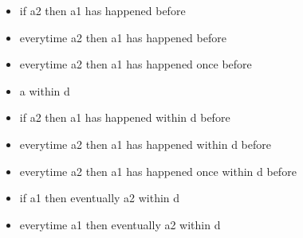 \begin{itemize}
	\item
\begin{IMITATORproperty}
if a2 then a1 has happened before
\end{IMITATORproperty}

	\item
\begin{IMITATORproperty}
everytime a2 then a1 has happened before
\end{IMITATORproperty}

	\item
\begin{IMITATORproperty}
everytime a2 then a1 has happened once before
\end{IMITATORproperty}

	\item
\begin{IMITATORproperty}
a within d
\end{IMITATORproperty}

	\item
\begin{IMITATORproperty}
if a2 then a1 has happened within d before
\end{IMITATORproperty}

	\item
\begin{IMITATORproperty}
everytime a2 then a1 has happened within d before
\end{IMITATORproperty}

	\item
\begin{IMITATORproperty}
everytime a2 then a1 has happened once within d before
\end{IMITATORproperty}

	\item
\begin{IMITATORproperty}
if a1 then eventually a2 within d
\end{IMITATORproperty}

	\item
\begin{IMITATORproperty}
everytime a1 then eventually a2 within d
\end{IMITATORproperty}


\end{itemize}
